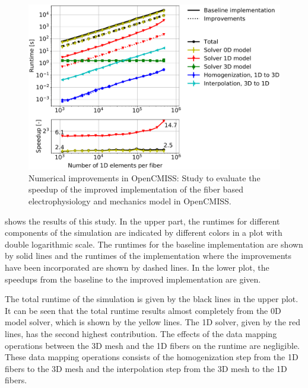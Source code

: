 \begin{figure}
  \centering%
  \includegraphics[width=\textwidth]{images/results/studies/opencmiss_cuboid_serial_scaling_comparison_aggressive.pdf}%
  \caption{Numerical improvements in OpenCMISS: Study to evaluate the speedup of the improved implementation of the fiber based electrophysiology and mechanics model in OpenCMISS.}%
  \label{fig:opencmiss_improvements}%
\end{figure}%

 shows the results of this study. In the upper part, the runtimes for different components of the simulation are indicated by different colors in a plot with double logarithmic scale. The runtimes for the baseline implementation are shown by solid lines and the runtimes of the implementation where the improvements have been incorporated are shown by dashed lines. In the lower plot, the speedups from the baseline to the improved implementation are given.

The total runtime of the simulation is given by the black lines in the upper plot. It can be seen that the total runtime results almost completely from the 0D model solver, which is shown by the yellow lines. The 1D solver, given by the red lines, has the second highest contribution. The effects of the data mapping operations between the 3D mesh and the 1D fibers on the runtime are negligible. These data mapping operations consists of the homogenization step from the 1D fibers to the 3D mesh and the interpolation step from the 3D mesh to the 1D fibers.

